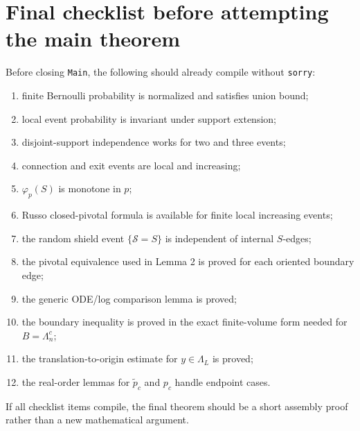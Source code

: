 \documentclass[11pt]{article}
\newcommand{\pcrit}{p_c}
\newcommand{\ptilde}{\widetilde p_c}
\newcommand{\Lam}{\Lambda}
\theoremstyle{definition}
\theoremstyle{plain}
\begin{document}
\section{Final checklist before attempting the main theorem}

Before closing \texttt{Main}, the following should already compile without \texttt{sorry}:
\begin{enumerate}[label=\textbf{C\arabic*.}, leftmargin=1.6em]
  \item finite Bernoulli probability is normalized and satisfies union bound;
  \item local event probability is invariant under support extension;
  \item disjoint-support independence works for two and three events;
  \item connection and exit events are local and increasing;
  \item $\varphi_p(S)$ is monotone in $p$;
  \item Russo closed-pivotal formula is available for finite local increasing events;
  \item the random shield event $\{\mathcal S=S\}$ is independent of internal $S$-edges;
  \item the pivotal equivalence used in Lemma 2 is proved for each oriented boundary edge;
  \item the generic ODE/log comparison lemma is proved;
  \item the boundary inequality is proved in the exact finite-volume form needed for $B=\Lam_n^c$;
  \item the translation-to-origin estimate for $y\in\Lam_L$ is proved;
  \item the real-order lemmas for $\ptilde$ and $\pcrit$ handle endpoint cases.
\end{enumerate}

If all checklist items compile, the final theorem should be a short assembly proof rather than a new mathematical argument.
\end{document}
